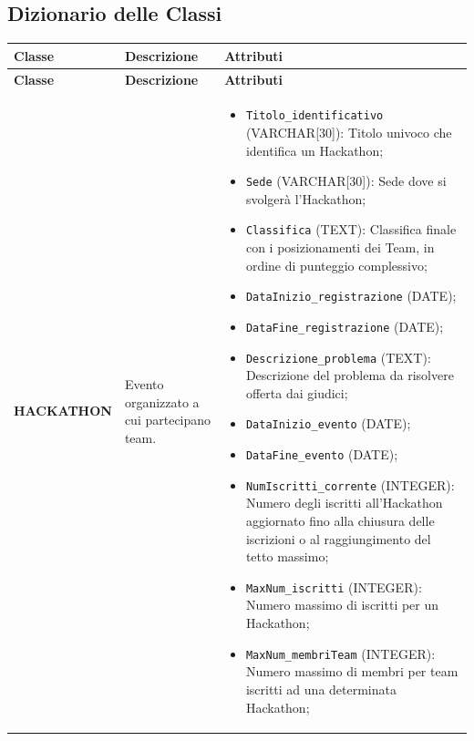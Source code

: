 \documentclass[a4paper, 10pt]{article}
\renewcommand{\arraystretch}{1.2} %
\begin{document}
	\subsection{Dizionario delle Classi}
	{\footnotesize %
		\setlength{\arrayrulewidth}{0.5pt}  %
		\renewcommand{\arraystretch}{1.2}  %
		\begin{longtable}{
			>{\raggedright\arraybackslash}p{4cm} %
			>{\centering\arraybackslash}p{4cm}    %
			>{\raggedright\arraybackslash}p{6.5cm}%
			}
			\hline
			\textbf{Classe} & \textbf{Descrizione} & \textbf{Attributi} \\
			\hline
			\endfirsthead
			\hline
			\textbf{Classe} & \textbf{Descrizione} & \textbf{Attributi} \\
			\hline
			\endhead
			\hline
			\endfoot
			\hline
			\endlastfoot
			
			\textbf{HACKATHON} &
			Evento organizzato a cui partecipano team. &
			\begin{itemize}
				\item \texttt{Titolo\_identificativo} (VARCHAR[30]): Titolo univoco che identifica un Hackathon;
				\item \texttt{Sede} (VARCHAR[30]): Sede dove si svolgerà l'Hackathon;
				\item \texttt{Classifica} (TEXT): Classifica finale con i posizionamenti dei Team, in ordine di punteggio complessivo;
				\item \texttt{DataInizio\_registrazione} (DATE);
				\item \texttt{DataFine\_registrazione} (DATE);
				\item \texttt{Descrizione\_problema} (TEXT): Descrizione del problema da risolvere offerta dai giudici;
				\item \texttt{DataInizio\_evento} (DATE);
				\item \texttt{DataFine\_evento} (DATE);
				\item \texttt{NumIscritti\_corrente} (INTEGER): Numero degli iscritti all'Hackathon aggiornato fino alla chiusura delle iscrizioni o al raggiungimento del tetto massimo;
				\item \texttt{MaxNum\_iscritti} (INTEGER): Numero massimo di iscritti per un Hackathon;
				\item \texttt{MaxNum\_membriTeam} (INTEGER): Numero massimo di membri per team iscritti ad una determinata Hackathon;
			\end{itemize} \\
			\hline
			

\end{longtable}}
\end{document}
